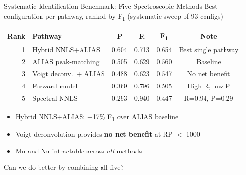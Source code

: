 \documentclass[aspectratio=169,10pt]{beamer}
\begin{document}
\begin{frame}{Systematic Identification Benchmark: Five Spectroscopic Methods}
	{\small Best configuration per pathway, ranked by F\textsubscript{1} (systematic sweep of 93 configs)}

	\vspace{0.3em}
	\centering
	{\small
	\begin{tabular}{rlcccc}
		\toprule
		\textbf{Rank} & \textbf{Pathway} & \textbf{P} & \textbf{R} & \textbf{F\textsubscript{1}} & \textbf{Note} \\
		\midrule
		1 & Hybrid NNLS+ALIAS & 0.604 & 0.713 & 0.654 & Best single pathway \\
		2 & ALIAS peak-matching     & 0.505 & 0.629 & 0.560 & Baseline \\
		3 & Voigt deconv.\ + ALIAS  & 0.488 & 0.623 & 0.547 & No net benefit \\
		4 & Forward model           & 0.369 & 0.796 & 0.505 & High R, low P \\
		5 & Spectral NNLS           & 0.293 & 0.940 & 0.447 & R=0.94, P=0.29 \\
		\bottomrule
	\end{tabular}}

	\vspace{0.3em}
	\begin{itemize}
		\item {\small Hybrid NNLS+ALIAS: \alert{+17\% F\textsubscript{1}} over ALIAS baseline}
		\item {\small Voigt deconvolution provides \textbf{no net benefit} at RP $<$ 1000}
		\item {\small Mn and Na intractable across \emph{all} methods}
	\end{itemize}

	\vspace{0.2em}
	\centering
	\alert{Can we do better by combining all five?}
\end{frame}
\end{document}
